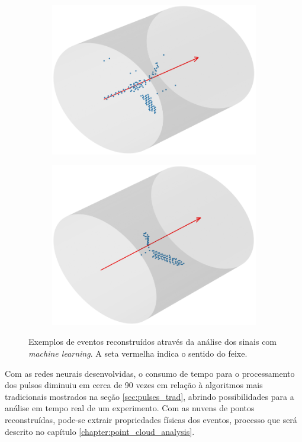 \documentclass[a4paper,12pt,oneside]{book}
\begin{document}
\begin{figure}[H]
\begin{subfigure}[b]{0.48\textwidth}
        \includegraphics[scale=0.38]{figs/ex_ev_3.png}
        \caption{}
        \label{subfig:ex_ev_3}
    \end{subfigure}%
    \hfill
    \begin{subfigure}[b]{0.48\textwidth}
        \centering
        \includegraphics[scale=0.38]{figs/ex_ev_4.png}
        \caption{}
        \label{subfig:ex_ev_4}
    \end{subfigure}
\caption{Exemplos de eventos reconstruídos através da análise dos sinais com \textit{machine learning}. A seta vermelha indica o sentido do feixe.}
\label{fig:ex_eventos}
\end{figure}

\par Com as redes neurais desenvolvidas, o consumo de tempo para o processamento dos pulsos diminuiu em cerca de 90 vezes em relação à algoritmos mais tradicionais mostrados na seção \ref{sec:pulses_trad}, abrindo possibilidades para a análise em tempo real de um experimento. Com as nuvens de pontos reconstruídas, pode-se extrair propriedades físicas dos eventos, processo que será descrito no capítulo \ref{chapter:point_cloud_analysis}.
\end{document}
